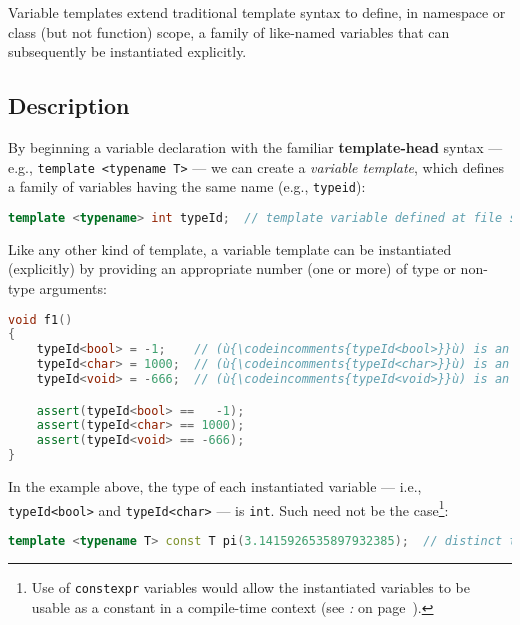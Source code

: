 

Variable templates extend traditional template syntax to define, in namespace or
class (but not function) scope, a family of like-named variables that
can subsequently be instantiated explicitly.

\subsection[Description]{Description}\label{variabletemplate-description}

By beginning a variable declaration with the familiar
\textbf{template-head} syntax --- e.g.,
\texttt{template}~\texttt{<typename}~\texttt{T>} --- we can create a
\emph{variable template}, which defines a family of variables having the
same name (e.g., \texttt{typeid}):

\begin{lstlisting}[language=C++]
template <typename> int typeId;  // template variable defined at file scope
\end{lstlisting}
    
\noindent Like any other kind of template, a variable template can be instantiated
(explicitly) by providing an appropriate number (one or more) of type or
non-type arguments:

\begin{lstlisting}[language=C++]
void f1()
{
    typeId<bool> = -1;    // (ù{\codeincomments{typeId<bool>}}ù) is an (ù{\codeincomments{int}}ù)
    typeId<char> = 1000;  // (ù{\codeincomments{typeId<char>}}ù) is an (ù{\codeincomments{int}}ù)
    typeId<void> = -666;  // (ù{\codeincomments{typeId<void>}}ù) is an (ù{\codeincomments{int}}ù)

    assert(typeId<bool> ==   -1);
    assert(typeId<char> == 1000);
    assert(typeId<void> == -666);
}
\end{lstlisting}
    
\noindent In the example above, the type of each instantiated variable --- i.e.,
\texttt{typeId<bool>} and \texttt{typeId<char>} --- is \texttt{int}.
Such need not be the case{\cprotect\footnote{Use of
  \texttt{constexpr} variables would allow the instantiated
  variables to be usable as a constant in a compile-time context (see
  {\it{}:} {\it{}} on page~\pageref{parametrized-constants}).}}:

\begin{lstlisting}[language=C++]
template <typename T> const T pi(3.1415926535897932385);  // distinct types
\end{lstlisting}
    
